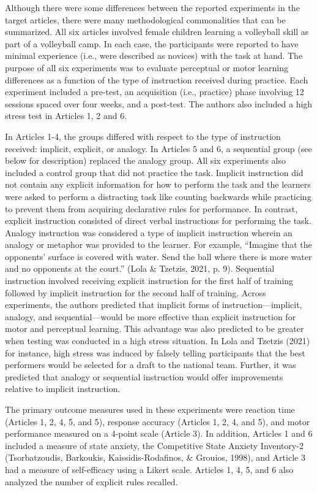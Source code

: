 \documentclass[
  english,
  man, donotrepeattitle,floatsintext]{apa7}
\begin{document}
Although there were some differences between the reported experiments in the target articles, there were many methodological commonalities that can be summarized. All six articles involved female children learning a volleyball skill as part of a volleyball camp. In each case, the participants were reported to have minimal experience (i.e., were described as novices) with the task at hand. The purpose of all six experiments was to evaluate perceptual or motor learning differences as a function of the type of instruction received during practice. Each experiment included a pre-test, an acquisition (i.e., practice) phase involving 12 sessions spaced over four weeks, and a post-test. The authors also included a high stress test in Articles 1, 2 and 6.

In Articles 1-4, the groups differed with respect to the type of instruction received: implicit, explicit, or analogy. In Articles 5 and 6, a sequential group (see below for description) replaced the analogy group. All six experiments also included a control group that did not practice the task. Implicit instruction did not contain any explicit information for how to perform the task and the learners were asked to perform a distracting task like counting backwards while practicing to prevent them from acquiring declarative rules for performance. In contrast, explicit instruction consisted of direct verbal instructions for performing the task. Analogy instruction was considered a type of implicit instruction wherein an analogy or metaphor was provided to the learner. For example, ``Imagine that the opponents' surface is covered with water. Send the ball where there is more water and no opponents at the court.'' (Lola \& Tzetzis, 2021, p. 9). Sequential instruction involved receiving explicit instruction for the first half of training followed by implicit instruction for the second half of training. Across experiments, the authors predicted that implicit forms of instruction---implicit, analogy, and sequential---would be more effective than explicit instruction for motor and perceptual learning. This advantage was also predicted to be greater when testing was conducted in a high stress situation. In Lola and Tzetzis (2021) for instance, high stress was induced by falsely telling participants that the best performers would be selected for a draft to the national team. Further, it was predicted that analogy or sequential instruction would offer improvements relative to implicit instruction.

The primary outcome measures used in these experiments were reaction time (Articles 1, 2, 4, 5, and 5), response accuracy (Articles 1, 2, 4, and 5), and motor performance measured on a 4-point scale (Article 3). In addition, Articles 1 and 6 included a measure of state anxiety, the Competitive State Anxiety Inventory-2 (Tsorbatzoudis, Barkoukis, Kaissidis-Rodafinos, \& Grouios, 1998), and Article 3 had a measure of self-efficacy using a Likert scale. Articles 1, 4, 5, and 6 also analyzed the number of explicit rules recalled.
\end{document}
